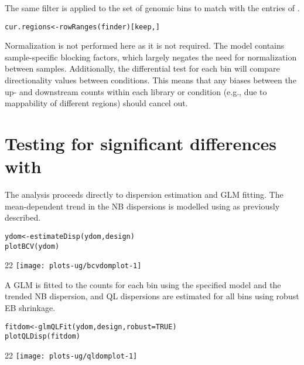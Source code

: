 \documentclass{report}\usepackage[]{graphicx}\usepackage[usenames,dvipsnames]{color}
\makeatletter
\def\maxwidth{ %
  \ifdim\Gin@nat@width>\linewidth
    \linewidth
  \else
    \Gin@nat@width
  \fi
}
\newcommand{\hlnum}[1]{\textcolor[rgb]{0.816,0.125,0.439}{#1}}%
\newcommand{\hlstd}[1]{\textcolor[rgb]{0.251,0.251,0.251}{#1}}%
\newcommand{\hlkwb}[1]{\textcolor[rgb]{0,0,0}{#1}}%
\newcommand{\hlkwc}[1]{\textcolor[rgb]{0.251,0.251,0.251}{#1}}%
\newcommand{\hlkwd}[1]{\textcolor[rgb]{0.878,0.439,0.125}{#1}}%
\newenvironment{knitrout}{}{} %
\makeatother
\begin{document}
The same filter is applied to the set of genomic bins to match with the entries of . 

\begin{knitrout}
\color{fgcolor}\begin{kframe}
\begin{alltt}
\hlstd{cur.regions} \hlkwb{<-} \hlkwd{rowRanges}\hlstd{(finder)[keep,]}
\end{alltt}
\end{kframe}
\end{knitrout}

Normalization is not performed here as it is not required. 
The model contains sample-specific blocking factors, which largely negates the need for normalization between samples.
Additionally, the differential test for each bin will compare directionality values between conditions.
This means that any biases between the up- and downstream counts within each library or condition (e.g., due to mappability of different regions) should cancel out.

\section{Testing for significant differences with }
The analysis proceeds directly to dispersion estimation and GLM fitting.
The mean-dependent trend in the NB dispersions is modelled using  as previously described.

\begin{knitrout}
\color{fgcolor}\begin{kframe}
\begin{alltt}
\hlstd{ydom} \hlkwb{<-} \hlkwd{estimateDisp}\hlstd{(ydom, design)}
\hlkwd{plotBCV}\hlstd{(ydom)}
\end{alltt}
\end{kframe}\begin{adjustwidth}{2\fltoffset}{2\fltoffset}
\texttt{[image: plots-ug/bcvdomplot-1]} \end{adjustwidth}
\end{knitrout}

A GLM is fitted to the counts for each bin using the specified model and the trended NB dispersion, and QL dispersions are estimated for all bins using robust EB shrinkage.

\begin{knitrout}
\color{fgcolor}\begin{kframe}
\begin{alltt}
\hlstd{fitdom} \hlkwb{<-} \hlkwd{glmQLFit}\hlstd{(ydom, design,} \hlkwc{robust}\hlstd{=}\hlnum{TRUE}\hlstd{)}
\hlkwd{plotQLDisp}\hlstd{(fitdom)}
\end{alltt}
\end{kframe}\begin{adjustwidth}{2\fltoffset}{2\fltoffset}
\texttt{[image: plots-ug/qldomplot-1]} \end{adjustwidth}
\end{knitrout}
\end{document}
